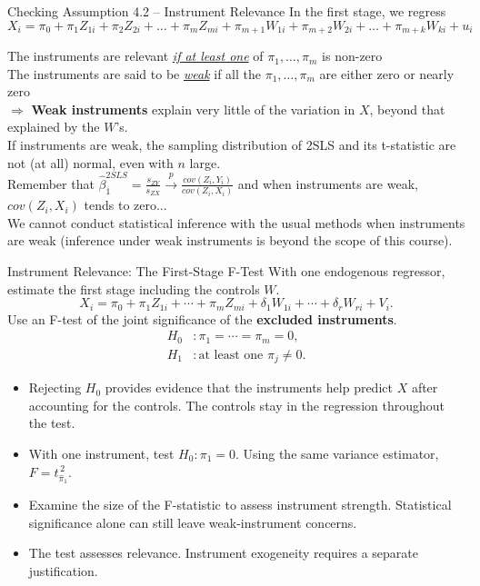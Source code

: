 \documentclass[notes,10pt, aspectratio=169]{beamer}
\begin{document}
\begin{frame}{Checking Assumption 4.2 -- Instrument Relevance}
In the first stage, we regress
\begin{equation*}
    X_i = \pi_0 + \pi_1 Z_{1i}+ \pi_2 Z_{2i} + \dots + \pi_m Z_{mi} + \pi_{m+1} W_{1i} + \pi_{m+2} W_{2i} + \dots + \pi_{m+k} W_{ki} +u_i
\end{equation*}

The instruments are relevant \underline{\textit{if at least one}} of $\pi_1, \dots, \pi_m$ is non-zero\\

The instruments are said to be \underline{\textit{weak}} if all the $\pi_1, \dots, \pi_m$ are either zero or nearly zero\\[1em]

$\Rightarrow$ \textbf{Weak instruments} explain very little of the variation in $X$, beyond that explained by the $W$’s.\\[1em]

If instruments are weak, the sampling distribution of 2SLS and its t-statistic are not (at all) normal, even with $n$ large.\\[1em]

Remember that $\hat{\beta}_1^{2SLS}= \frac{s_{ZY}}{s_{ZX}} \overset{p}{\to}  \frac{cov(Z_i, Y_i)}{cov(Z_i, X_i)}$ and when instruments are weak, $cov(Z_i, X_i)$ tends to zero...\\[1em]

We cannot conduct statistical inference with the usual methods when instruments are weak (inference under weak instruments is beyond the scope of this course).

\end{frame}



\begin{frame}{Instrument Relevance: The First-Stage F-Test}
\small
With one endogenous regressor, estimate the first stage including the controls $W$.
\[
X_i=\pi_0+\pi_1Z_{1i}+\cdots+\pi_mZ_{mi}
+\delta_1W_{1i}+\cdots+\delta_rW_{ri}+V_i.
\]
Use an F-test of the joint significance of the \textbf{excluded instruments}.
\[
\begin{aligned}
H_0 &: \pi_1=\cdots=\pi_m=0,\\
H_1 &: \text{at least one }\pi_j\ne0.
\end{aligned}
\]
\begin{itemize}
    \item Rejecting $H_0$ provides evidence that the instruments help predict $X$ after accounting for the controls. The controls stay in the regression throughout the test.
    \item With one instrument, test $H_0:\pi_1=0$. Using the same variance estimator, $F=t_{\hat\pi_1}^{\,2}$.
    \item Examine the size of the F-statistic to assess instrument strength. Statistical significance alone can still leave weak-instrument concerns.
    \item The test assesses relevance. Instrument exogeneity requires a separate justification.
\end{itemize}
\end{frame}
\end{document}
